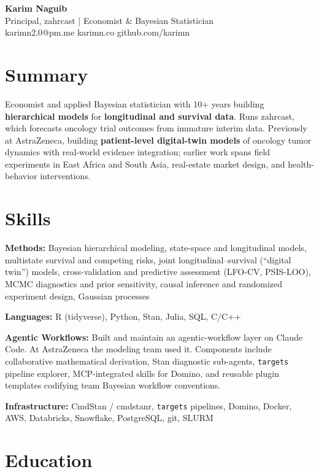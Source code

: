 \documentclass[11pt]{article}
\begin{document}
\begin{center}
{\Large \textbf{Karim Naguib}}\\[2mm]
Principal, zahrcast | Economist \& Bayesian Statistician\\[1mm]
karimn2.0@pm.me \quad karimn.co \quad github.com/karimn
\end{center}

\vspace{4mm}

\section*{Summary}

Economist and applied Bayesian statistician with 10+ years building \textbf{hierarchical models} for \textbf{longitudinal and survival data}. Runs zahrcast, which forecasts oncology trial outcomes from immature interim data. Previously at AstraZeneca, building \textbf{patient-level digital-twin models} of oncology tumor dynamics with real-world evidence integration; earlier work spans field experiments in East Africa and South Asia, real-estate market design, and health-behavior interventions.

\section*{Skills}

\textbf{Methods:} Bayesian hierarchical modeling, state-space and longitudinal models, multistate survival and competing risks, joint longitudinal--survival (``digital twin'') models, cross-validation and predictive assessment (LFO-CV, PSIS-LOO), MCMC diagnostics and prior sensitivity, causal inference and randomized experiment design, Gaussian processes

\textbf{Languages:} R (tidyverse), Python, Stan, Julia, SQL, C/C++

\textbf{Agentic Workflows:} Built and maintain an agentic-workflow layer on Claude Code. At AstraZeneca the modeling team used it. Components include collaborative mathematical derivation, Stan diagnostic sub-agents, \texttt{targets} pipeline explorer, MCP-integrated skills for Domino, and reusable plugin templates codifying team Bayesian workflow conventions.

\textbf{Infrastructure:} CmdStan / cmdstanr, \texttt{targets} pipelines, Domino, Docker, AWS, Databricks, Snowflake, PostgreSQL, git, SLURM

\section*{Education}
\end{document}
